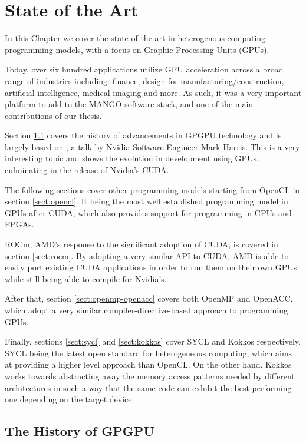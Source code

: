 \chapter{State of the Art} \label{ch:StateOfTheArt}

In this Chapter we cover the state of the art in heterogenous computing programming models, with a focus on Graphic Processing Units (GPUs). 

Today, over six hundred applications utilize GPU acceleration across a broad range of industries including: finance, design for manufacturing/construction, artificial intelligence, medical imaging and more. As such, it was a very important platform to add to the MANGO software stack, and one of the main contributions of our thesis.

Section \ref{sect:history-gpgpu} covers the history of advancements in GPGPU technology and is largely based on \cite{brief_history_gpgpu}, a talk by Nvidia Software Engineer Mark Harris. This is a very interesting topic and shows the evolution in development using GPUs, culminating in the release of Nvidia's CUDA. 

The following sections cover other programming models starting from OpenCL in section \ref{sect:opencl}. It being the most well established programming model in GPUs after CUDA, which also provides support for programming in CPUs and FPGAs.

ROCm, AMD's response to the significant adoption of CUDA, is covered in section \ref{sect:rocm}. By adopting a very similar API to CUDA, AMD is able to easily port existing CUDA applications in order to run them on their own GPUs while still being able to compile for Nvidia's.

After that, section \ref{sect:openmp-openacc} covers both OpenMP and OpenACC, which adopt a very similar compiler-directive-based approach to programming GPUs.

Finally, sections \ref{sect:sycl} and \ref{sect:kokkos} cover SYCL and Kokkos respectively. SYCL being the latest open standard for heterogeneous computing, which aims at providing a higher level approach than OpenCL. On the other hand, Kokkos works towards abstracting away the memory access patterns needed by different architectures in such a way that the same code can exhibit the best performing one depending on the target device.

\section{The History of GPGPU} \label{sect:history-gpgpu}

